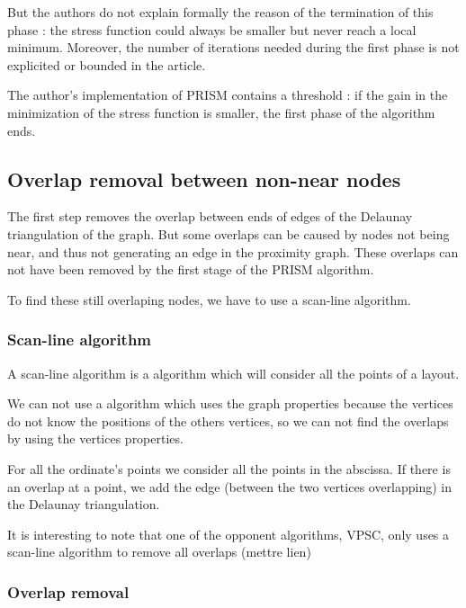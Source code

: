 \documentclass[12pt]{report}
\begin{document}
But the authors do not explain formally the reason of the termination of this phase : the stress function could always be smaller but never reach a local minimum. Moreover, the number of iterations needed during the first phase is not explicited or bounded in the article.

The author's implementation of PRISM contains a threshold : if the gain in the minimization of the stress function is smaller, the first phase of the algorithm ends.


\subsection{Overlap removal between non-near nodes}

The first step removes the overlap between ends of edges of the Delaunay triangulation of the graph. But some overlaps can be caused by nodes not being near, and thus not generating an edge in the proximity graph. These overlaps can not have been removed by the first stage of the PRISM algorithm.

To find these still overlaping nodes, we have to use a scan-line algorithm.
\subsubsection{Scan-line algorithm}

A scan-line algorithm is a algorithm which will consider all the points of a layout.

We can not use a algorithm which uses the graph properties because the vertices do not know the positions of the others vertices, so we can not find the overlaps by using the vertices properties.

For all the ordinate's points we consider all the points in the abscissa. If there is an overlap at a point, we add the edge (between the two vertices overlapping) in the Delaunay triangulation. 


\bigskip
It is interesting to note that one of the opponent algorithms, VPSC, only uses a scan-line algorithm to remove all overlaps (mettre lien)

\subsubsection{Overlap removal}
\end{document}
